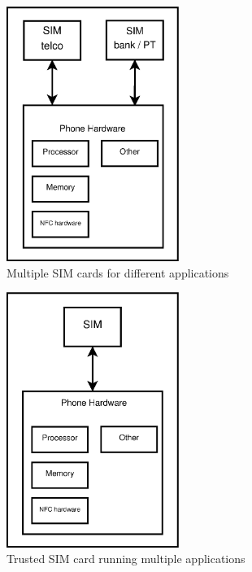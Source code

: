 \begin{figure}
\includegraphics[width=0.5\textwidth]{images/meerdere_sims}
\caption[Multiple SIM cards]
{
Multiple SIM cards for different applications
}
\label{fig:multi_sim}
\end{figure}

\begin{figure}
\includegraphics[width=0.5\textwidth]{images/SIM_is_SE}
\caption[Trusted SIM cards]
{
Trusted SIM card running multiple applications
}
\label{fig:sim_se}
\end{figure}



